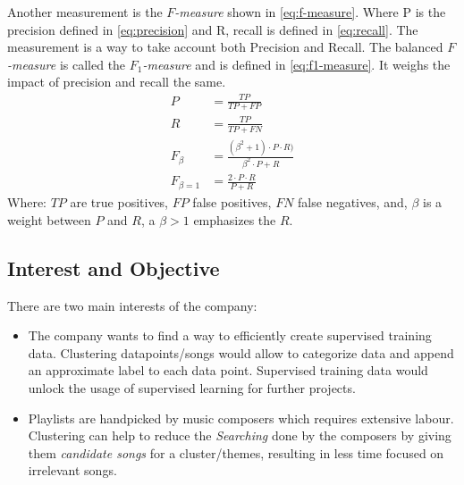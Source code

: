 \documentclass[a4paper,11pt]{article}
\begin{document}
Another measurement is the \textit{$F$-measure} shown in \ref{eq:f-measure}. Where P is the precision defined in \ref{eq:precision} and R, recall is defined in \ref{eq:recall}. The measurement is a way to take account both Precision and Recall. The balanced \textit{$F$-measure} is called the \textit{$F_1$-measure} and is defined in \ref{eq:f1-measure}. It weighs the impact of precision and recall the same.
\begin{align}
  \label{eq:precision}
  P &= \frac{TP}{TP+FP} \\
  \label{eq:recall}
  R &= \frac{TP}{TP+FN} \\
  \label{eq:f-measure}
  F_\beta &= \frac{(\beta^2 + 1) \cdot P \cdot R)}{\beta^2 \cdot P + R} \\
  \label{eq:f1-measure}
  F_{\beta = 1} &= \frac{2 \cdot P \cdot R}{P + R}
\end{align}
Where:\newline
$TP$ are true positives, $FP$ false positives, $FN$ false negatives, and, $\beta$ is a weight between $P$ and $R$, a $\beta > 1$ emphasizes the $R$.

\subsection{Interest and Objective}

There are two main interests of the company:

\begin{itemize}
\item
  The company wants to find a way to efficiently create supervised
  training data. Clustering datapoints/songs would allow to categorize
  data and append an approximate label to each data point. Supervised
  training data would unlock the usage of supervised learning for
  further projects.
\item
  Playlists are handpicked by music composers which requires extensive labour. Clustering can help to
  reduce the \textit{Searching} done by the composers by giving them
  \textit{candidate songs} for a cluster/themes, resulting in less time
  focused on irrelevant songs.
\end{itemize}

\end{document}
